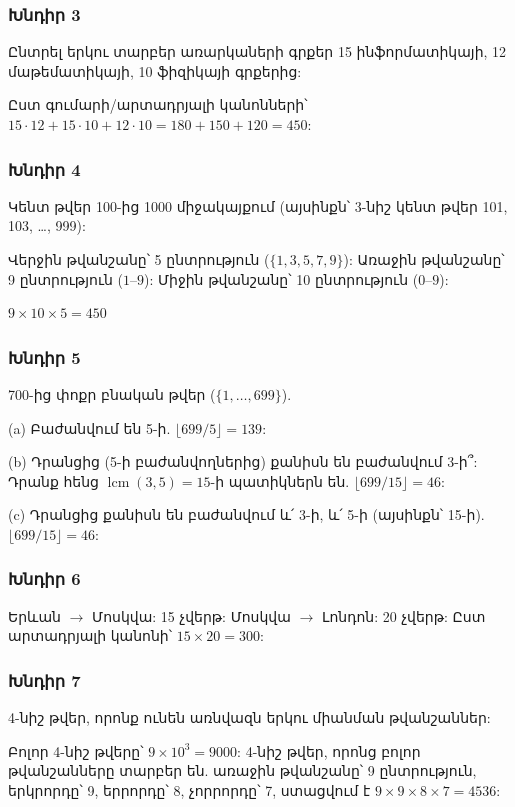 \subsubsection*{Խնդիր 3}
Ընտրել երկու տարբեր առարկաների գրքեր 15 ինֆորմատիկայի, 12 մաթեմատիկայի, 10 ֆիզիկայի գրքերից:

Ըստ գումարի/արտադրյալի կանոնների՝
$15\cdot12 + 15\cdot10 + 12\cdot10 = 180+150+120 = \boxed{450}$:

\subsubsection*{Խնդիր 4}
Կենտ թվեր 100-ից 1000 միջակայքում (այսինքն՝ 3-նիշ կենտ թվեր 101, 103, \ldots, 999):

Վերջին թվանշանը՝ 5 ընտրություն ($\{1,3,5,7,9\}$):
Առաջին թվանշանը՝ 9 ընտրություն ($1$--$9$):
Միջին թվանշանը՝ 10 ընտրություն ($0$--$9$):

$\boxed{9 \times 10 \times 5 = 450}$

\subsubsection*{Խնդիր 5}
700-ից փոքր բնական թվեր ($\{1,\dots,699\}$).

(a) Բաժանվում են 5-ի. $\lfloor 699/5\rfloor = \boxed{139}$:

(b) Դրանցից (5-ի բաժանվողներից) քանիսն են բաժանվում 3-ի՞: Դրանք հենց $\operatorname{lcm}(3,5)=15$-ի պատիկներն են. $\lfloor 699/15\rfloor = \boxed{46}$:

(c) Դրանցից քանիսն են բաժանվում և՛ 3-ի, և՛ 5-ի (այսինքն՝ 15-ի). $\lfloor 699/15\rfloor = \boxed{46}$:

\subsubsection*{Խնդիր 6}
Երևան $\to$ Մոսկվա: 15 չվերթ: Մոսկվա $\to$ Լոնդոն: 20 չվերթ:
Ըստ արտադրյալի կանոնի՝ $\boxed{15 \times 20 = 300}$:

\subsubsection*{Խնդիր 7}
4-նիշ թվեր, որոնք ունեն առնվազն երկու միանման թվանշաններ:

Բոլոր 4-նիշ թվերը՝ $9\times 10^3 = 9000$:
4-նիշ թվեր, որոնց բոլոր թվանշանները տարբեր են. առաջին թվանշանը՝ 9 ընտրություն, երկրորդը՝ 9, երրորդը՝ 8, չորրորդը՝ 7, ստացվում է $9\times 9\times 8\times 7 = 4536$:

